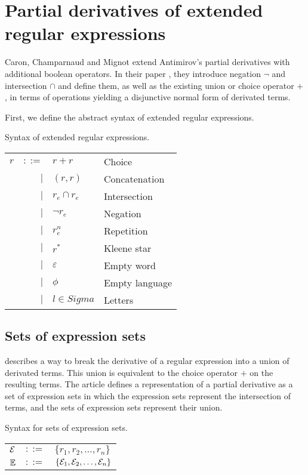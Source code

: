 \section{Partial derivatives of extended regular expressions}

Caron, Champarnaud and Mignot extend Antimirov's partial derivatives with
additional boolean operators. In their paper \cite{pdere}, they introduce
negation $\neg$ and intersection $\cap$ and define them, as well as the existing
union or choice operator $+$, in terms of operations yielding a disjunctive
normal form of derivated terms.

First, we define the abstract syntax of extended regular expressions.

\begin{defn}
   \label{defn-ere-syn}
   Syntax of extended regular expressions.

   \begin{tabular}{lrll}
      $r$	& $::=$	& $r+r$				& Choice		\\
		& $|$	& $(r,r)$			& Concatenation		\\
		& $|$	& $r_e \cap r_e$		& Intersection		\\
        	& $|$	& $\neg r_e$			& Negation		\\
        	& $|$	& $r_e^n$			& Repetition		\\
		& $|$	& $r^*$				& Kleene star		\\
		& $|$	& $\varepsilon$			& Empty word		\\
		& $|$	& $\phi$			& Empty language	\\
		& $|$	& $l \in Sigma$			& Letters		\\
   \end{tabular}
\end{defn}


\subsection{Sets of expression sets}

\cite{pdere} describes a way to break the derivative of a regular expression
into a union of derivated terms. This union is equivalent to the choice operator
$+$ on the resulting terms. The article defines a representation of a partial
derivative as a set of expression sets in which the expression sets represent
the intersection of terms, and the sets of expression sets represent their
union.

\begin{defn}
   \label{defn-esets}
   Syntax for sets of expression sets.

   \begin{tabular}{lll}
      $\mathcal{E}$	& $::=$ & $\{r_1, r_2, \dots, r_n\}$ \\
      $\mathbb{E}$	& $::=$ & $\{\mathcal{E}_1, \mathcal{E}_2, \dots, \mathcal{E}_n\}$ \\
   \end{tabular}
\end{defn}

